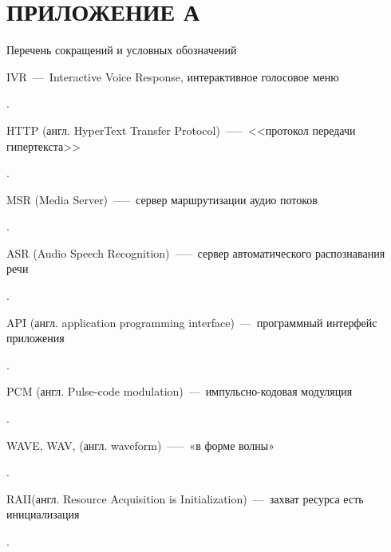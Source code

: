 \chapter{ПРИЛОЖЕНИЕ А}
\begin{center}
    Перечень сокращений и условных обозначений
\end{center}

\hypertarget{ivr}{IVR~---~Interactive Voice Response, интерактивное голосовое меню}.

\hypertarget{http}{HTTP (англ. HyperText Transfer Protocol)~—--~<<протокол передачи \\ \mbox{гипертекста}>>}.

\hypertarget{msr}{MSR (Media Server)~—--~сервер маршрутизации аудио потоков}.

\hypertarget{asr}{ASR (Audio Speech Recognition)~—--~сервер автоматического распознавания речи}.

\hypertarget{api}{API (англ. application programming interface)~---~программный интерфейс приложения}.

\hypertarget{pcm}{PCM (англ. Pulse-code modulation)~---~импульсно-кодовая модуляция}.

\hypertarget{wav}{WAVE, WAV, (англ. waveform)~—--~«в форме волны»}.

\hypertarget{raii}{RAII(англ. Resource Acquisition is Initialization)~---~захват ресурса есть инициализация}.

\clearpage

